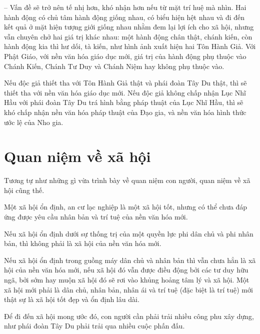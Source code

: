 -- Vấn đề sẽ trở nên tế nhị hơn, khó nhận hơn nếu từ mặt trí huệ mà nhìn. Hai hành động có chủ tâm hành động giống nhau, có biểu hiện hệt nhau và đi đến kết quả ở mặt hiện tượng giới giống nhau nhằm đem lại lợi ích cho xã hội, nhưng vẫn chuyên chở hai giá trị khác nhau: một hành động chân thật, chánh kiến, còn hành động kia thì hư dối, tà kiến, như hình ảnh xuất hiện hai Tôn Hành Giả. Với Phật Giáo, với nền văn hóa giáo dục mới, giá trị của hành động phụ thuộc vào Chánh Kiến, Chánh Tư Duy và Chánh Niệm hay không phụ thuộc vào.

Nếu độc giả thiết tha với Tôn Hành Giả thật và phái đoàn Tây Du thật, thì sẽ thiết tha với nền văn hóa giáo dục mới. Nếu độc giả không chấp nhận Lục Nhĩ Hầu với phái đoàn Tây Du trá hình bằng pháp thuật của Lục Nhĩ Hầu, thì sẽ khó chấp nhận nền văn hóa pháp thuật của Đạo gia, và nền văn hóa hình thức ước lệ của Nho gia.

\section{Quan niệm về xã hội} %
\label{sec:56_57_xa_hoi}

Tương tự như những gì vừa trình bày về quan niệm con người, quan niệm về xã hội cũng thế.

Một xã hội ổn định, an cư lạc nghiệp là một xã hội tốt, nhưng có thể chưa đáp ứng được yêu cầu nhân bản và trí tuệ của nền văn hóa mới.

Nếu xã hội ổn định dưới sự thống trị của một quyền lực phi dân chủ và phi nhân bản, thì không phải là xã hội của nền văn hóa mới.

Nếu xã hội ổn định trong guồng máy dân chủ và nhân bản thì vẫn chưa hẳn là xã hội của nền văn hóa mới, nếu xã hội đó vẫn được điều động bởi các tư duy hữu ngã, bởi sớm hay muộn xã hội đó sẽ rơi vào khủng hoảng tâm lý và xã hội. Một xã hội mới phải là dân chủ, nhân bản, nhân ái và trí tuệ (đặc biệt là trí tuệ) mới thật sự là xã hội tốt đẹp và ổn định lâu dài.

Để đi đến xã hội mong ước đó, con người cần phải trải nhiều công phu xây dựng, như phái đoàn Tây Du phải trải qua nhiều cuộc phấn đấu.

